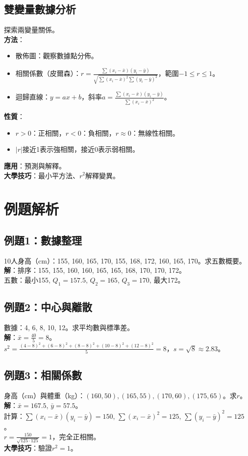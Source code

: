 \subsection{雙變量數據分析}
探索兩變量關係。\\
\textbf{方法}：
\begin{itemize}
    \item 散佈圖：觀察數據點分佈。
    \item 相關係數（皮爾森）：$r = \frac{\sum (x_i - \bar{x})(y_i - \bar{y})}{\sqrt{\sum (x_i - \bar{x})^2 \sum (y_i - \bar{y})^2}}$，範圍$-1 \leq r \leq 1$。
    \item 迴歸直線：$y = ax + b$，斜率$a = \frac{\sum (x_i - \bar{x})(y_i - \bar{y})}{\sum (x_i - \bar{x})^2}$。
\end{itemize}
\textbf{性質}：
\begin{itemize}
    \item $r > 0$：正相關，$r < 0$：負相關，$r \approx 0$：無線性相關。
    \item $|r|$接近1表示強相關，接近0表示弱相關。
\end{itemize}
\textbf{應用}：預測與解釋。\\
\textbf{大學技巧}：最小平方法、$r^2$解釋變異。

\section{例題解析}

\subsection{例題1：數據整理}
10人身高（cm）：155, 160, 165, 170, 155, 168, 172, 160, 165, 170。求五數概要。\\
\textbf{解}：排序：155, 155, 160, 160, 165, 165, 168, 170, 170, 172。\\
五數：最小155, $Q_1=157.5$, $Q_2=165$, $Q_3=170$, 最大172。

\subsection{例題2：中心與離散}
數據：4, 6, 8, 10, 12。求平均數與標準差。\\
\textbf{解}：$\bar{x} = \frac{40}{5} = 8$。\\
$s^2 = \frac{(4-8)^2 + (6-8)^2 + (8-8)^2 + (10-8)^2 + (12-8)^2}{5} = 8$，$s = \sqrt{8} \approx 2.83$。

\subsection{例題3：相關係數}
身高（cm）與體重（kg）：$(160, 50), (165, 55), (170, 60), (175, 65)$。求$r$。\\
\textbf{解}：$\bar{x} = 167.5$, $\bar{y} = 57.5$。\\
計算：$\sum (x_i - \bar{x})(y_i - \bar{y}) = 150$, $\sum (x_i - \bar{x})^2 = 125$, $\sum (y_i - \bar{y})^2 = 125$。\\
$r = \frac{150}{\sqrt{125 \cdot 125}} = 1$，完全正相關。\\
\textbf{大學技巧}：驗證$r^2 = 1$。

